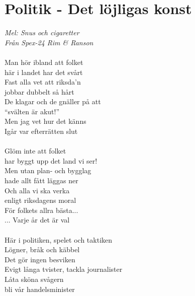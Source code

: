 \documentclass[a5paper,15pt]{article}
\begin{document}
\section{Politik - Det löjligas konst}
\emph{Mel: Snus och cigaretter \\
Från Spex-24 Rim \& Ranson}\\
\\

Man hör ibland att folket \\här i landet har det svårt\\
Fast alla vet att riksda'n \\jobbar dubbelt så hårt\\
De klagar och de gnäller på att \\“svälten är akut!”\\
Men jag vet hur det känns \\Igår var efterrätten slut\\
\\
Glöm inte att folket \\har byggt upp det land vi ser!\\
Men utan plan- och bygglag \\hade allt fått läggas ner\\
Och alla vi ska verka \\enligt riksdagens moral\\
För folkets allra bästa...\\
... Varje år det är val\\
\\
Här i politiken, spelet och taktiken\\
Lögner, bråk och käbbel\\
Det gör ingen besviken\\
Evigt långa tvister, tackla journalister\\
Låta sköna svågern \\
bli vår handelsminister\\
\\
\end{document}
